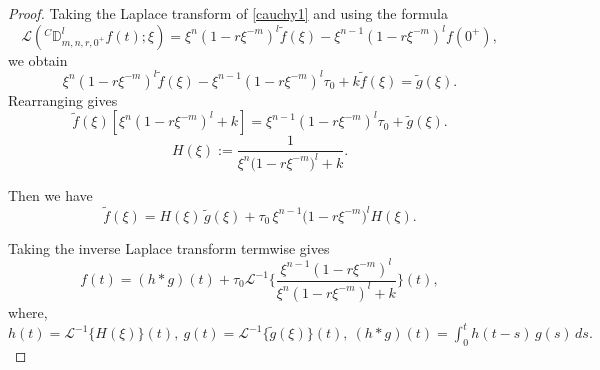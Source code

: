 \documentclass[10pt,a4paper]{amsart}
\begin{document}
    \begin{proof}
        	Taking the Laplace transform of \eqref{cauchy1} and using the formula  
	\[
	\mathcal{L}({}^{C}\mathbb{D}^{l}_{m,n,r,0^+} f(t) ;\xi)
	= \xi^{n}(1 - r \xi^{-m})^{l}\tilde{f}(\xi) - \xi^{n-1}(1 - r \xi^{-m})^{l}f(0^+),
	\]
	we obtain
	\[
	\xi^{n}(1 - r \xi^{-m})^{l}\tilde{f}(\xi) - \xi^{n-1}(1 - r \xi^{-m})^{l}\tau_0 + k \tilde{f}(\xi) = \tilde{g}(\xi).
	\]
 Rearranging gives
	\[
	\tilde{f}(\xi)[\xi^{n}(1 - r \xi^{-m})^{l} + k]
	= \xi^{n-1}(1 - r \xi^{-m})^{l}\tau_0 + \tilde{g}(\xi).
	\]
    \[
H(\xi) := \frac{1}{\xi^{n}\big(1 - r\xi^{-m}\big)^{l} + k}.
\]

Then we have
\[
\widetilde{f}(\xi)
= H(\xi)\,\widetilde{g}(\xi)
+ \tau_{0}\,\xi^{n-1}\big(1 - r\xi^{-m}\big)^{l}H(\xi).
\]

Taking the inverse Laplace transform termwise gives
\[
f(t)= (h *g)(t)+\tau_{0}\mathcal{L}^{-1}\Big\{\frac{\xi^{n-1}(1 - r \xi^{-m})^{l}}{\xi^{n}(1 - r \xi^{-m})^{l} + k}\Big\}(t),
\]
where, $h(t) = \mathcal{L}^{-1}\{H(\xi)\}(t),
~
g(t) = \mathcal{L}^{-1}\{\widetilde{g}(\xi)\}(t),~
(h * g)(t) = \int_{0}^{t} h(t - s)\,g(s)\,ds.
$

    
    
    
    
    
    
    
    
    
    
    
    
    
    
    
    

\end{proof}
\end{document}
